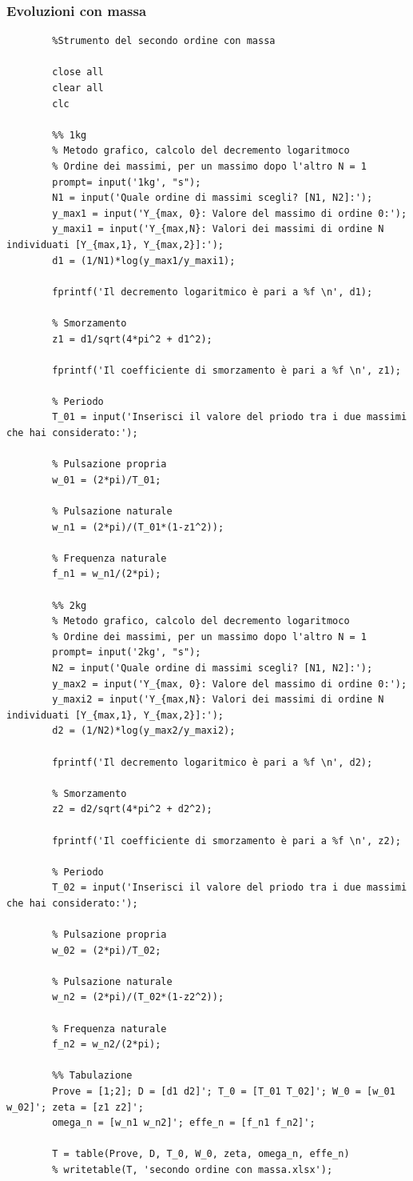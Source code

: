 \documentclass[a4paper, 12pt, twoside]{report}
\begin{document}
\subsubsection{Evoluzioni con massa}	
\footnotesize
	\begin{verbatim}
		%Strumento del secondo ordine con massa
		
		close all
		clear all
		clc
		
		%% 1kg
		% Metodo grafico, calcolo del decremento logaritmoco
		% Ordine dei massimi, per un massimo dopo l'altro N = 1
		prompt= input('1kg', "s");
		N1 = input('Quale ordine di massimi scegli? [N1, N2]:');
		y_max1 = input('Y_{max, 0}: Valore del massimo di ordine 0:');
		y_maxi1 = input('Y_{max,N}: Valori dei massimi di ordine N individuati [Y_{max,1}, Y_{max,2}]:');
		d1 = (1/N1)*log(y_max1/y_maxi1);
		
		fprintf('Il decremento logaritmico è pari a %f \n', d1);
		
		% Smorzamento
		z1 = d1/sqrt(4*pi^2 + d1^2);
		
		fprintf('Il coefficiente di smorzamento è pari a %f \n', z1);
		
		% Periodo
		T_01 = input('Inserisci il valore del priodo tra i due massimi che hai considerato:');
		
		% Pulsazione propria 
		w_01 = (2*pi)/T_01;
		
		% Pulsazione naturale
		w_n1 = (2*pi)/(T_01*(1-z1^2));
		
		% Frequenza naturale 
		f_n1 = w_n1/(2*pi);
		
		%% 2kg
		% Metodo grafico, calcolo del decremento logaritmoco
		% Ordine dei massimi, per un massimo dopo l'altro N = 1
		prompt= input('2kg', "s");
		N2 = input('Quale ordine di massimi scegli? [N1, N2]:');
		y_max2 = input('Y_{max, 0}: Valore del massimo di ordine 0:');
		y_maxi2 = input('Y_{max,N}: Valori dei massimi di ordine N individuati [Y_{max,1}, Y_{max,2}]:');
		d2 = (1/N2)*log(y_max2/y_maxi2);
		
		fprintf('Il decremento logaritmico è pari a %f \n', d2);
		
		% Smorzamento
		z2 = d2/sqrt(4*pi^2 + d2^2);
		
		fprintf('Il coefficiente di smorzamento è pari a %f \n', z2);
		
		% Periodo
		T_02 = input('Inserisci il valore del priodo tra i due massimi che hai considerato:');
		
		% Pulsazione propria 
		w_02 = (2*pi)/T_02;
		
		% Pulsazione naturale
		w_n2 = (2*pi)/(T_02*(1-z2^2));
		
		% Frequenza naturale 
		f_n2 = w_n2/(2*pi);
				
		%% Tabulazione 
		Prove = [1;2]; D = [d1 d2]'; T_0 = [T_01 T_02]'; W_0 = [w_01 w_02]'; zeta = [z1 z2]'; 
		omega_n = [w_n1 w_n2]'; effe_n = [f_n1 f_n2]';
		
		T = table(Prove, D, T_0, W_0, zeta, omega_n, effe_n)
		% writetable(T, 'secondo ordine con massa.xlsx');	
	\end{verbatim}			
\restoregeometry			


	
	
	
	
	
	
	
	
	
	
	
	
		
\end{document}
